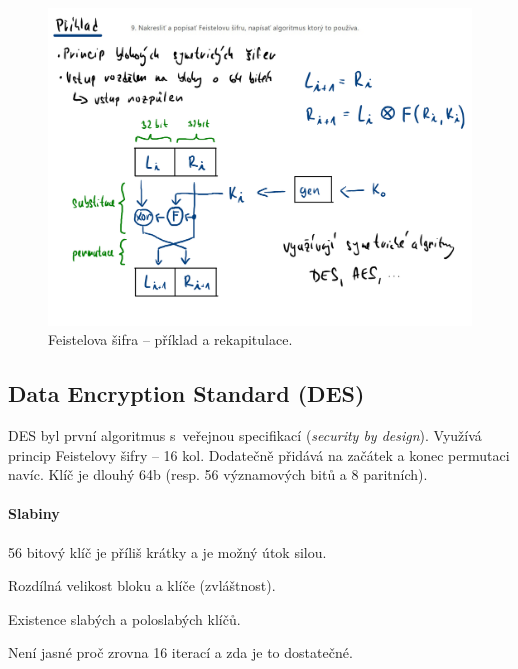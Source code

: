 \begin{figure}[H]
    \centering
    \includegraphics[width=1\linewidth]{feistel_example.pdf}
    \caption{Feistelova šifra -- příklad a rekapitulace.}
\end{figure}

\subsection{Data Encryption Standard (DES)}

DES byl první algoritmus s~veřejnou specifikací (\textit{security by design}). Využívá princip Feistelovy šifry -- 16 kol. Dodatečně přidává na začátek a konec permutaci navíc. Klíč je dlouhý 64b (resp. 56 významových bitů a 8 paritních).

\paragraph*{Slabiny} \begin{compactitem}
    \item 56 bitový klíč je příliš krátky a je možný útok silou.
    \item Rozdílná velikost bloku a klíče (zvláštnost).
    \item Existence slabých a poloslabých klíčů.
    \item Není jasné proč zrovna 16 iterací a zda je to dostatečné.
\end{compactitem}

